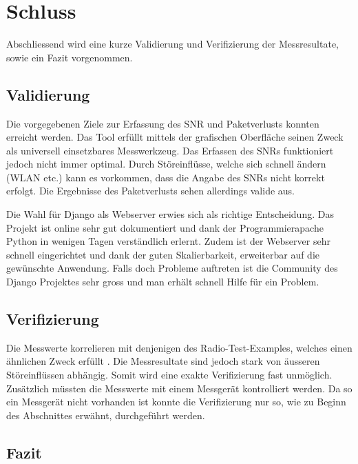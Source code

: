 \newpage
\section{Schluss}\label{sec:SchlussP2P}

Abschliessend wird eine kurze Validierung und Verifizierung der Messresultate, sowie ein Fazit vorgenommen.

\subsection{Validierung}\label{subsec:P2PValidierung}
Die vorgegebenen Ziele zur Erfassung des SNR und Paketverlusts konnten erreicht werden. Das Tool erfüllt mittels der grafischen Oberfläche seinen Zweck als universell einsetzbares Messwerkzeug. Das Erfassen des SNRs funktioniert jedoch nicht immer optimal. Durch Störeinflüsse, welche sich schnell ändern (WLAN etc.) kann es vorkommen, dass die Angabe des SNRs nicht korrekt erfolgt. Die Ergebnisse des Paketverlusts sehen allerdings valide aus.

Die Wahl für Django als Webserver erwies sich als richtige Entscheidung. Das Projekt ist online sehr gut dokumentiert und dank der Programmierapache Python in wenigen Tagen verständlich erlernt. Zudem ist der Webserver sehr schnell eingerichtet und dank der guten Skalierbarkeit, erweiterbar auf die gewünschte Anwendung. Falls doch Probleme auftreten ist die Community des Django Projektes sehr gross und man erhält schnell Hilfe für ein Problem.

\subsection{Verifizierung}\label{subsec:P2PVerifizierung}
Die Messwerte korrelieren mit denjenigen des Radio-Test-Examples, welches einen ähnlichen Zweck erfüllt \cite{nrf_connect_sdk_radio_test_example_2020}.
Die Messresultate sind jedoch stark von äusseren Störeinflüssen abhängig. Somit wird eine exakte Verifizierung fast unmöglich. Zusätzlich müssten die Messwerte mit einem Messgerät kontrolliert werden. Da so ein Messgerät nicht vorhanden ist konnte die Verifizierung nur so, wie zu Beginn des Abschnittes erwähnt, durchgeführt werden.

\subsection{Fazit}\label{subsec:FazitP2P}
